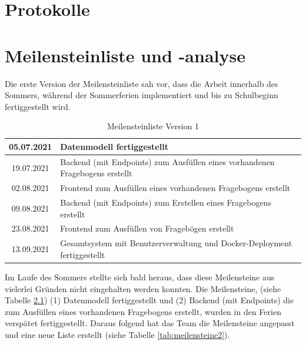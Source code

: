 \chapter{Protokolle}


\chapter{Meilensteinliste und -analyse}
\label{meilensteile}
Die erste Version der Meilensteinliste sah vor, dass die Arbeit innerhalb des Sommers,
während der Sommerferien implementiert und bis zu Schulbeginn fertiggestellt wird. 
\begin{table}[H]
    \centering
    \caption{Meilensteinliste Version 1}
    \label{tab:meilensteine1}
    \begin{tabular}{|c|l|}
        \hline
        05.07.2021 & Datenmodell fertiggestellt \\ \hline
        19.07.2021 & Backend (mit Endpoints) zum Ausfüllen eines vorhandenen Fragebogens erstellt \\ \hline
        02.08.2021 & Frontend zum Ausfüllen eines vorhandenen Fragebogens erstellt \\ \hline
        09.08.2021 & Backend (mit Endpoints) zum Erstellen eines Fragebogens erstellt \\ \hline
        23.08.2021 & Frontend zum Ausfüllen von Fragebögen erstellt \\ \hline
        13.09.2021 & Gesamtsystem mit Benutzerverwaltung und Docker-Deployment fertiggestellt \\ \hline
        \end{tabular}
\end{table}

Im Laufe des Sommers stellte sich bald heraus, dass diese Meilensteine aus vielerlei Gründen 
nicht eingehalten werden konnten. 
Die Meilensteine, (siehe Tabelle \ref{tab:meilensteine1}) (1) Datenmodell fertiggestellt und (2) Backend (mit Endpoints) 
die zum Ausfüllen eines vorhandenen Fragebogens erstellt, 
wurden in den Ferien verspätet fertiggestellt. Daraus folgend hat das Team die Meilensteine angepasst und eine neue
Liste erstellt (siehe Tabelle \ref{tab:meilensteine2}).

